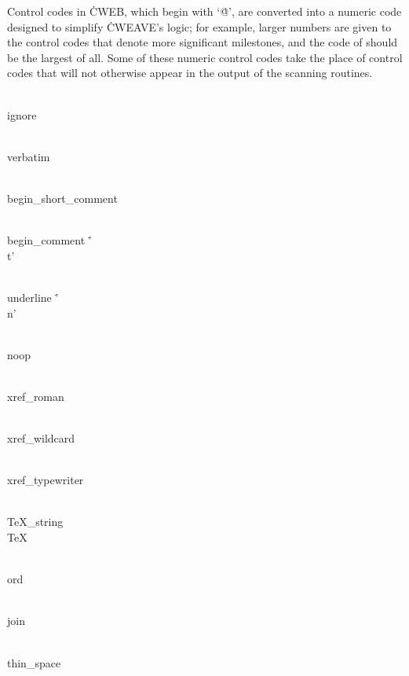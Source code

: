 \fi

Control codes in \.{CWEB}, which begin with `\.{@}', are converted
into a numeric code designed to simplify \.{CWEAVE}'s logic; for example,
larger numbers are given to the control codes that denote more significant
milestones, and the code of  should be the largest of
all. Some of these numeric control codes take the place of 
control codes that will not otherwise appear in the output of the
scanning routines.

\Y\B\4\D\\{ignore}\5
\par
\B\4\D\\{verbatim}\5
\par
\B\4\D\\{begin\_short\_comment}\5
\par
\B\4\D\\{begin\_comment}\5
\.{'\\t'}\par
\B\4\D\\{underline}\5
\.{'\\n'}\par
\B\4\D\\{noop}\5
\par
\B\4\D\\{xref\_roman}\5
\par
\B\4\D\\{xref\_wildcard}\5
\par
\B\4\D\\{xref\_typewriter}\5
\par
\B\4\D\TeXxstring\5
\par
\B\F\\{TeX\_string}\5
\\{TeX}\par
\B\4\D\\{ord}\5
\par
\B\4\D\\{join}\5
\par
\B\4\D\\{thin\_space}\5
